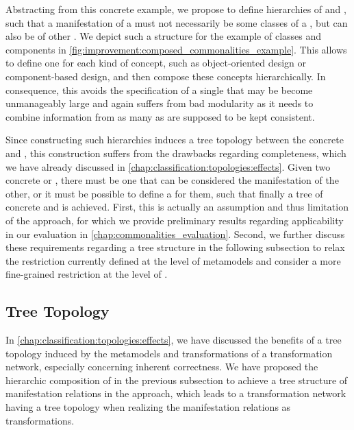 Abstracting from this concrete example, we propose to define hierarchies of \commonalities and \conceptmetamodels, such that a manifestation of a \commonality must not necessarily be some classes of a \concretemetamodel, but can also be \commonalities of other \conceptmetamodels.
We depict such a structure for the example of classes and components in \autoref{fig:improvement:composed_commonalities_example}.
This allows to define one \conceptmetamodel for each kind of concept, such as object-oriented design or component-based design, and then compose these concepts hierarchically.
In consequence, this avoids the specification of a single \conceptmetamodel that may be become unmanageably large and again suffers from bad modularity as it needs to combine information from as many \concretemetamodels as are supposed to be kept consistent.

Since constructing such hierarchies induces a tree topology between the concrete and \conceptmetamodels, this construction suffers from the drawbacks regarding completeness, which we have already discussed in \autoref{chap:classification:topologies:effects}.
Given two concrete or \conceptmetamodels, there must be one that can be considered the manifestation of the other, or it must be possible to define a \conceptmetamodel for them, such that finally a tree of concrete and \conceptmetamodels is achieved.
First, this is actually an assumption and thus limitation of the approach, for which we provide preliminary results regarding applicability in our evaluation in \autoref{chap:commonalities_evaluation}.
Second, we further discuss these requirements regarding a tree structure in the following subsection to relax the restriction currently defined at the level of metamodels and consider a more fine-grained restriction at the level of \metaclasses.


\subsection{Tree Topology}
\label{chap:improvement:commonalities:tree}

In \autoref{chap:classification:topologies:effects}, we have discussed the benefits of a tree topology induced by the metamodels and transformations of a transformation network, especially concerning inherent correctness.
We have proposed the hierarchic composition of \conceptmetamodels in the previous subsection to achieve a tree structure of manifestation relations in the \commonalities approach, which leads to a transformation network having a tree topology when realizing the manifestation relations as transformations.

